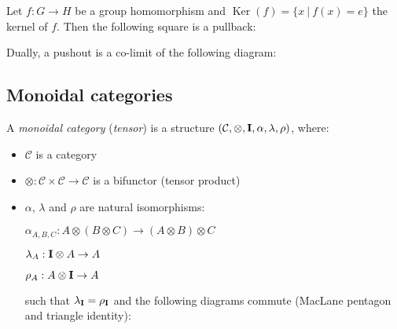 \documentclass[a4paper]{article}
\theoremstyle{defin}
\theoremstyle{theorem}
\theoremstyle{claim}
\theoremstyle{prop}
\theoremstyle{lemma}
\theoremstyle{fact}
\theoremstyle{ex}
\theoremstyle{col}
\begin{document}
Let $f : G \to H$ be a group homomorphism and $\operatorname{Ker}(f) = \{ x \: | \: f(x) = e \}$ the kernel of $f$. Then the following square is a pullback:

\centerline{
}

Dually, a pushout is a co-limit of the following diagram:

\centerline{
}

\subsection{Monoidal categories}

A \emph{monoidal category} (\emph{tensor}) is a structure $(\mathcal{C}, \otimes, {\bf I}, \alpha, \lambda, \rho)$, where:
\begin{itemize}
\item $\mathcal{C}$ is a category
\item $\otimes : \mathcal{C} \times \mathcal{C} \to \mathcal{C}$ is a bifunctor (tensor product)
\item $\alpha$, $\lambda$ and $\rho$ are natural isomorphisms:

\begin{center}
$\alpha_{A,B,C} : A \otimes (B \otimes C) \to (A \otimes B) \otimes C$

$\lambda_A : {\bf I} \otimes A \to A$

$\rho_A : A \otimes {\bf I} \to A$
\end{center}

such that $\lambda_{\bf I} = \rho_{\bf I}$ and the following diagrams commute (MacLane pentagon and triangle identity):

\vspace{\baselineskip}

\centerline{
}

\centerline{
}
\end{itemize}
\end{document}
